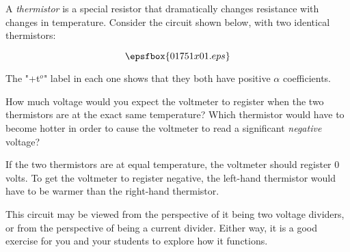 

A {\it thermistor} is a special resistor that dramatically changes resistance with changes in temperature.  Consider the circuit shown below, with two identical thermistors:

$$\epsfbox{01751x01.eps}$$

The "+t$^{o}$" label in each one shows that they both have positive $\alpha$ coefficients.

How much voltage would you expect the voltmeter to register when the two thermistors are at the exact same temperature?  Which thermistor would have to become hotter in order to cause the voltmeter to read a significant {\it negative} voltage?







If the two thermistors are at equal temperature, the voltmeter should register 0 volts.  To get the voltmeter to register negative, the left-hand thermistor would have to be warmer than the right-hand thermistor.







This circuit may be viewed from the perspective of it being two voltage dividers, or from the perspective of being a current divider.  Either way, it is a good exercise for you and your students to explore how it functions.




